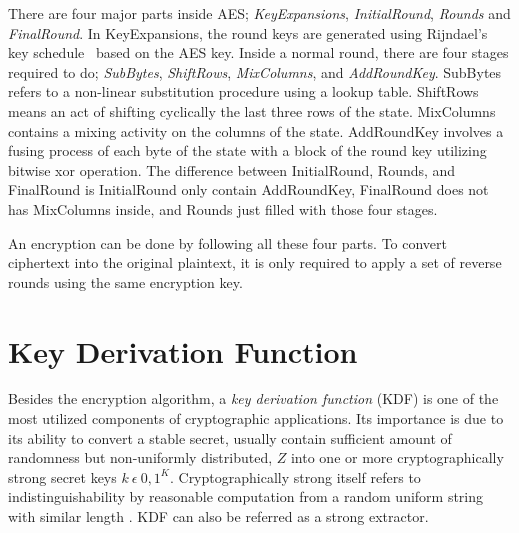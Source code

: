 There are four major parts inside AES; \textit{KeyExpansions}, \textit{InitialRound}, \textit{Rounds} and \textit{FinalRound}. In KeyExpansions, the round keys are generated using Rijndael's key schedule
 based on the AES key.
Inside a normal round, there are four stages required to do; \textit{SubBytes}, \textit{ShiftRows}, \textit{MixColumns}, and \textit{AddRoundKey}.
SubBytes refers to a non-linear substitution procedure using a lookup table. ShiftRows means an act of shifting cyclically the last three rows of the state. MixColumns contains a mixing activity on the columns of the state.
AddRoundKey involves a fusing process of each byte of the state with a block of the round key utilizing bitwise xor operation. The difference between InitialRound, Rounds, and FinalRound is InitialRound only contain AddRoundKey, FinalRound does not has MixColumns inside, and Rounds just filled with those four stages.

An encryption can be done by following all these four parts. To convert ciphertext into the original plaintext, it is only required to apply a set of reverse rounds using the same encryption key.

\section{Key Derivation Function}
Besides the encryption algorithm, a \textit{key derivation function} (KDF) is one of the most utilized components of cryptographic applications. Its importance is due to its ability to convert a stable secret, usually contain sufficient amount of randomness but non-uniformly distributed,  $Z$ into one or more cryptographically strong secret keys $k\ \epsilon\ {0,1}^K$.
Cryptographically strong itself refers to indistinguishability by reasonable computation from a random uniform string with similar length \cite{key_derivation}.
KDF can also be referred as a strong extractor.

